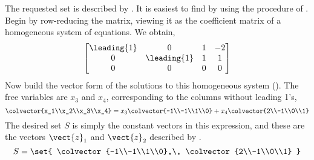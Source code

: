 The requested set is described by .  It is easiest to find by using the procedure of .  Begin by row-reducing the matrix, viewing it as the coefficient matrix of a homogeneous system of equations.  We obtain,
%
\begin{equation*}
\begin{bmatrix}
\leading{1} & 0 & 1 & -2\\
0 & \leading{1} & 1 & 1\\
0 & 0 & 0 & 0
\end{bmatrix}
\end{equation*}
%
Now build the vector form of the solutions to this homogeneous system ().  The free variables are $x_3$ and $x_4$, corresponding to the columns without leading 1's,
%
\begin{equation*}
\colvector{x_1\\x_2\\x_3\\x_4}=
x_3\colvector{-1\\-1\\1\\0}+
x_4\colvector{2\\-1\\0\\1}
\end{equation*}
%
The desired set $S$ is simply the constant vectors in this expression, and these are the vectors $\vect{z}_1$ and $\vect{z}_2$ described by .
%
\begin{equation*}
S=\set{
\colvector{-1\\-1\\1\\0},\,
\colvector{2\\-1\\0\\1}
}
\end{equation*}
